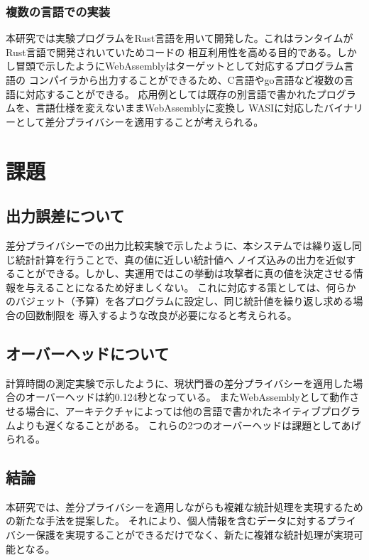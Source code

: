\documentclass[a4paper,11pt]{jreport}
\begin{document}
\subsection{複数の言語での実装}

本研究では実験プログラムをRust言語を用いて開発した。これはランタイムがRust言語で開発されいていためコードの
相互利用性を高める目的である。しかし冒頭で示したようにWebAssemblyはターゲットとして対応するプログラム言語の
コンパイラから出力することができるため、C言語やgo言語など複数の言語に対応することができる。
応用例としては既存の別言語で書かれたプログラムを、言語仕様を変えないままWebAssemblyに変換し
WASIに対応したバイナリーとして差分プライバシーを適用することが考えられる。

\chapter{課題}

\section{出力誤差について}

差分プライバシーでの出力比較実験で示したように、本システムでは繰り返し同じ統計計算を行うことで、真の値に近しい統計値へ
ノイズ込みの出力を近似することができる。しかし、実運用ではこの挙動は攻撃者に真の値を決定させる情報を与えることになるため好ましくない。
これに対応する策としては、何らかのバジェット（予算）を各プログラムに設定し、同じ統計値を繰り返し求める場合の回数制限を
導入するような改良が必要になると考えられる。

\section{オーバーヘッドについて}

計算時間の測定実験で示したように、現状門番の差分プライバシーを適用した場合のオーバーヘッドは約0.124秒となっている。
またWebAssemblyとして動作させる場合に、アーキテクチャによっては他の言語で書かれたネイティブプログラムよりも遅くなることがある。
これらの2つのオーバーヘッドは課題としてあげられる。

\section{結論}
本研究では、差分プライバシーを適用しながらも複雑な統計処理を実現するための新たな手法を提案した。
それにより、個人情報を含むデータに対するプライバシー保護を実現することができるだけでなく、新たに複雑な統計処理が実現可能となる。
\end{document}
